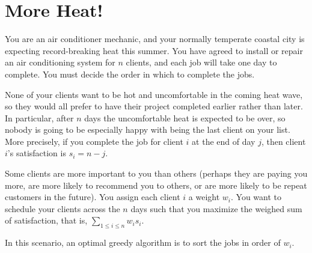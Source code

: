 \documentclass[11pt,fleqn]{exam}
\begin{document}
\section{More Heat!}

You are an air conditioner mechanic, and your normally temperate coastal city is expecting record-breaking heat this summer. You have agreed to install or repair an air conditioning system for $n$ clients, and each job will take one day to complete. You must decide the order in which to complete the jobs.

None of your clients want to be hot and uncomfortable in the coming heat wave, so they would all prefer to have their project completed earlier rather than later. In particular, after $n$ days the uncomfortable heat is expected to be over, so nobody is going to be especially happy with being the last client on your list. More precisely, if you complete the job for client $i$ at the end of day $j$, then client $i$'s satisfaction is $s_i = n-j$.

Some clients are more important to you than others (perhaps they are paying you more, are more likely to recommend you to others, or are more likely to be repeat customers in the future). You assign each client $i$ a weight $w_i$. You want to schedule your clients across the $n$ days such that you maximize the weighed sum of satisfaction, that is, $\sum_{1 \le i \le n} w_i s_i$.

In this scenario, an optimal greedy algorithm is to sort the jobs in order of $w_i$.
\end{document}
